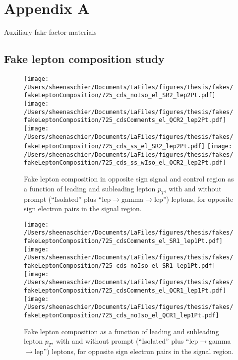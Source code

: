 \chapter{Appendix A}
Auxiliary fake factor materials

\section{Fake lepton composition study}

\begin{figure}[htb]
        \centering
        \texttt{[image: /Users/sheenaschier/Documents/LaFiles/figures/thesis/fakes/fakeLeptonComposition/725\_cds\_noIso\_el\_SR2\_lep2Pt.pdf]}
        \texttt{[image: /Users/sheenaschier/Documents/LaFiles/figures/thesis/fakes/fakeLeptonComposition/725\_cdsComments\_el\_QCR2\_lep2Pt.pdf]}
        \texttt{[image: /Users/sheenaschier/Documents/LaFiles/figures/thesis/fakes/fakeLeptonComposition/725\_cds\_ss\_el\_SR2\_lep2Pt.pdf]}
                \texttt{[image: /Users/sheenaschier/Documents/LaFiles/figures/thesis/fakes/fakeLeptonComposition/725\_cds\_ss\_wIso\_el\_QCR2\_lep2Pt.pdf]}
        \caption{Fake lepton composition in opposite sign signal and control region as a function of leading and subleading lepton $p_{T}$, with and without prompt (``Isolated'' plus ``lep$\to$gamma$\to$lep'') leptons, for opposite sign electron pairs in the signal region.}
        \label{fig:el}
\end{figure}

\begin{figure}[htb]
        \centering
        \texttt{[image: /Users/sheenaschier/Documents/LaFiles/figures/thesis/fakes/fakeLeptonComposition/725\_cdsComments\_el\_SR1\_lep1Pt.pdf]}
        \texttt{[image: /Users/sheenaschier/Documents/LaFiles/figures/thesis/fakes/fakeLeptonComposition/725\_cds\_noIso\_el\_SR1\_lep1Pt.pdf]}
        \texttt{[image: /Users/sheenaschier/Documents/LaFiles/figures/thesis/fakes/fakeLeptonComposition/725\_cdsComments\_el\_QCR1\_lep1Pt.pdf]}
          \texttt{[image: /Users/sheenaschier/Documents/LaFiles/figures/thesis/fakes/fakeLeptonComposition/725\_cds\_noIso\_el\_QCR1\_lep1Pt.pdf]}
        \caption{Fake lepton composition as a function of leading and subleading lepton $p_{T}$, with and without prompt (``Isolated'' plus ``lep$\to$gamma$\to$lep'') leptons, for opposite sign electron pairs in the signal region.}
        \label{fig:elSR}
\end{figure}

